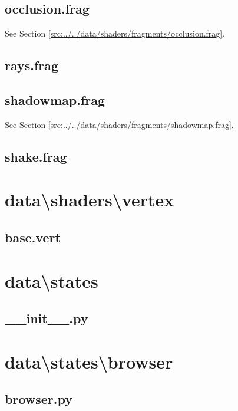 \documentclass[../main/main.tex]{subfiles}
\begin{document}
\subsection{occlusion.frag}
See Section \ref{src:../../data/shaders/fragments/occlusion.frag}.

\subsection{rays.frag}

\label{src:data/shaders/fragments/rays.frag}

\subsection{shadowmap.frag}
See Section \ref{src:../../data/shaders/fragments/shadowmap.frag}.

\subsection{shake.frag}

\label{src:data/shaders/fragments/shake.frag}

\section{data\textbackslash shaders\textbackslash vertex}
\subsection{base.vert}

\label{src:data/shaders/vertex/base.vert}

\section{data\textbackslash states}
\subsection{\_\_init\_\_.py}

\label{src:data/states/__init__.py}

\section{data\textbackslash states\textbackslash browser}
\subsection{browser.py}

\label{src:data/states/browser/browser.py}
\end{document}
